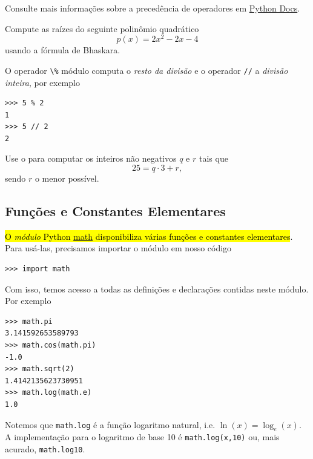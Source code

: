 \documentclass[12pt]{article}
\begin{document}
\begin{obs}
Consulte mais informações sobre a precedência de operadores em \href{https://docs.python.org/3/reference/expressions.html#operator-precedence}{Python Docs}.
\end{obs}

\begin{exr}\label{exr:bhaskara}
  Compute as raízes do seguinte polinômio quadrático
  \begin{equation}
    p(x) = 2x^2 - 2x - 4
  \end{equation}
  usando a fórmula de Bhaskara{\bhaskara}.
\end{exr}

O operador \lstinline+\%+ módulo computa o \emph{resto da divisão} e o operador \lstinline+//+ a \emph{divisão inteira}, por exemplo
\begin{lstlisting}
>>> 5 % 2
1
>>> 5 // 2
2
\end{lstlisting}

\begin{exr}
  Use o {\python} para computar os inteiros não negativos $q$ e $r$ tais que
  \begin{equation}
    25 = q\cdot 3 + r,
  \end{equation}
  sendo $r$ o menor possível.
\end{exr}

\subsection{Funções e Constantes Elementares}

\hl{O \emph{módulo} Python {\href{https://docs.python.org/3/library/math.html}{math}} disponibiliza várias funções e constantes elementares}. Para usá-las, precisamos importar o módulo em nosso código
\begin{lstlisting}
>>> import math
\end{lstlisting}
Com isso, temos acesso a todas as definições e declarações contidas neste módulo. Por exemplo
\begin{lstlisting}
>>> math.pi
3.141592653589793
>>> math.cos(math.pi)
-1.0
>>> math.sqrt(2)
1.4142135623730951
>>> math.log(math.e)
1.0
\end{lstlisting}

\begin{obs}
  Notemos que \lstinline+math.log+ é a função logaritmo natural, i.e. $\ln(x) = \log_e(x)$. A implementação {\python} para o logaritmo de base 10 é \lstinline+math.log(x,10)+ ou, mais acurado, \lstinline+math.log10+.
\end{obs}
\end{document}

